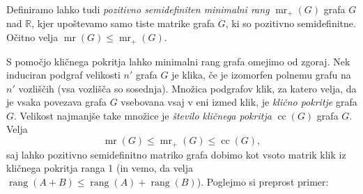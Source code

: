 \documentclass[12pt,a4paper,twoside]{article}
\theoremstyle{definition} %
\theoremstyle{plain} %
\numberwithin{equation}{section}  %
\newcommand{\R}{\mathbb R}
\DeclareMathOperator{\mr}{mr}
\DeclareMathOperator{\rang}{rang}
\DeclareMathOperator{\cc}{cc}
\begin{document}
Definiramo lahko tudi \emph{pozitivno semidefiniten minimalni rang} $\mr_+(G)$ grafa $G$ nad $\R$, kjer upoštevamo samo tiste matrike grafa $G$, ki so pozitivno semidefinitne. Očitno velja $\mr(G) \leq \mr_+(G)$.

S pomočjo kličnega pokritja lahko minimalni rang grafa omejimo od zgoraj. Nek induciran podgraf velikosti $n'$ grafa $G$ je klika, če je izomorfen polnemu grafu na $n'$ vozliščih (vsa vozlišča so sosednja). Množica podgrafov klik, za katero velja, da je vsaka povezava grafa $G$ vsebovana vsaj v eni izmed klik, je \emph{klično pokritje} grafa $G$. Velikost najmanjše take množice je \emph{število kličnega pokritja} $\cc(G)$ grafa $G$. Velja~\cite{booth2008minimum}
\begin{equation}
\label{eq:mr-cc}
\mr(G) \leq \mr_+(G) \leq \cc(G),
\end{equation}
saj lahko pozitivno semidefinitno matriko grafa dobimo kot vsoto matrik klik iz kličnega pokritja ranga 1 (in vemo, da velja $\rang(A+B) \leq \rang(A) + \rang(B)$). Poglejmo si preprost primer:
\end{document}
